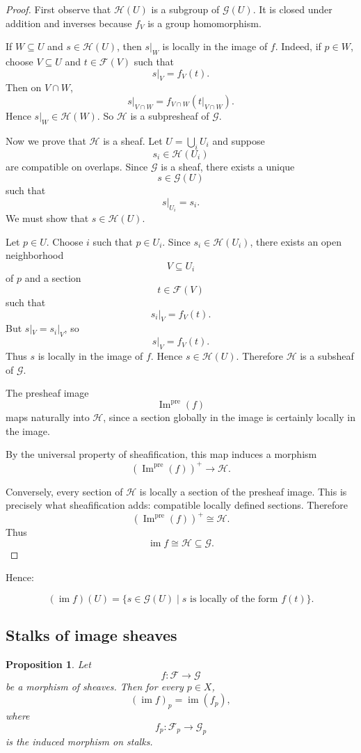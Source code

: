 \documentclass[12pt,a4paper]{article}
\DeclareMathOperator{\im}{im}
\theoremstyle{notespace}
\newtheorem{proposition}[definition]{Proposition}
\begin{document}
\begin{proof}
	First observe that $\mathcal H(U)$ is a subgroup of $\mathcal G(U)$.
	It is closed under addition and inverses because $f_V$ is a group homomorphism.
	
	If $W \subseteq U$ and $s \in \mathcal H(U)$, then $s|_W$ is locally in the
	image of $f$.
	Indeed, if $p \in W$, choose $V \subseteq U$ and $t \in \mathcal F(V)$ such
	that
	\[
	s|_V=f_V(t).
	\]
	Then on $V \cap W$,
	\[
	s|_{V \cap W}
	=
	f_{V \cap W}(t|_{V \cap W}).
	\]
	Hence $s|_W \in \mathcal H(W)$.
	So $\mathcal H$ is a subpresheaf of $\mathcal G$.
	
	Now we prove that $\mathcal H$ is a sheaf.
	Let $U=\bigcup_i U_i$ and suppose
	\[
	s_i \in \mathcal H(U_i)
	\]
	are compatible on overlaps.
	Since $\mathcal G$ is a sheaf, there exists a unique
	\[
	s \in \mathcal G(U)
	\]
	such that
	\[
	s|_{U_i}=s_i.
	\]
	We must show that $s \in \mathcal H(U)$.
	
	Let $p \in U$.
	Choose $i$ such that $p \in U_i$.
	Since $s_i \in \mathcal H(U_i)$, there exists an open neighborhood
	\[
	V \subseteq U_i
	\]
	of $p$ and a section
	\[
	t \in \mathcal F(V)
	\]
	such that
	\[
	s_i|_V=f_V(t).
	\]
	But $s|_V=s_i|_V$, so
	\[
	s|_V=f_V(t).
	\]
	Thus $s$ is locally in the image of $f$.
	Hence $s \in \mathcal H(U)$.
	Therefore $\mathcal H$ is a subsheaf of $\mathcal G$.
	
	The presheaf image
	\[
	\operatorname{Im}^{\operatorname{pre}}(f)
	\]
	maps naturally into $\mathcal H$, since a section globally in the image is
	certainly locally in the image.
	
	By the universal property of sheafification, this map induces a morphism
	\[
	\left(
	\operatorname{Im}^{\operatorname{pre}}(f)
	\right)^+
	\longrightarrow
	\mathcal H.
	\]
	
	Conversely, every section of $\mathcal H$ is locally a section of the presheaf
	image. This is precisely what sheafification adds: compatible locally defined
	sections.
	Therefore
	\[
	\left(
	\operatorname{Im}^{\operatorname{pre}}(f)
	\right)^+
	\cong
	\mathcal H.
	\]
	Thus
	\[
	\im f \cong \mathcal H \subseteq \mathcal G.
	\]
\end{proof}

Hence:

\[
\boxed{
	(\im f)(U)
	=
	\{s \in \mathcal G(U)
	\mid
	s \text{ is locally of the form } f(t)\}.
}
\]

\subsection{Stalks of image sheaves}
\begin{proposition}
	Let
	\[
	f:\mathcal F \longrightarrow \mathcal G
	\]
	be a morphism of sheaves.
	Then for every $p \in X$,
	\[
	(\im f)_p
	=
	\im(f_p),
	\]
	where
	\[
	f_p:\mathcal F_p\to\mathcal G_p
	\]
	is the induced morphism on stalks.
\end{proposition}
\end{document}

